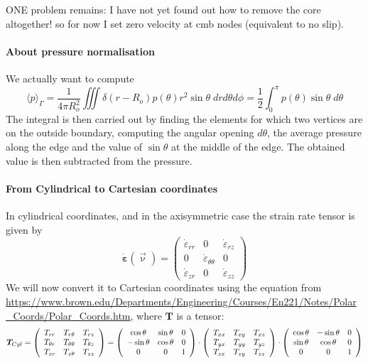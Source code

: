 ONE problem remains: I have not yet found out how to remove the core altogether!
so for now I set zero velocity at cmb nodes (equivalent to no slip).

\paragraph{About pressure normalisation}

We actually want to compute 
\[
\langle p \rangle _\Gamma = \frac{1}{4\pi R_o^2} \iiint \delta(r-R_o) p(\theta) r^2 \sin\theta \; dr d\theta d\phi 
= \frac{1}{2} \int_0^\pi p(\theta) \sin\theta \; d\theta
\]
The integral is then carried out by finding the elements for which two vertices are on the outside boundary, 
computing the angular opening $d\theta$, the average pressure along the edge and the value of $\sin\theta$ at the
middle of the edge. 
The obtained value is then subtracted from the pressure. 

\paragraph{From Cylindrical to Cartesian coordinates}

In cylindrical coordinates, and in the axisymmetric case
the strain rate tensor is given by
\[
\dot{\bm\varepsilon}(\vec\upnu)
=
\left(
\begin{array}{ccc}
\dot\varepsilon_{rr} & 0 & \dot{\varepsilon}_{rz} \\
0 & \dot{\varepsilon}_{\theta\theta}  & 0 \\
\dot{\varepsilon}_{zr} & 0 & \dot\varepsilon_{zz}
\end{array}
\right)
\]
We will now convert it to Cartesian coordinates using the equation from \url{https://www.brown.edu/Departments/Engineering/Courses/En221/Notes/Polar_Coords/Polar_Coords.htm}, where ${\bm T}$ is a tensor:
\[
{\bm T}_{\tiny Cyl}=
\left(
\begin{array}{ccc}
T_{rr}       & T_{r\theta}      & T_{rz} \\
T_{\theta r} & T_{\theta\theta} & T_{\theta z} \\
T_{z r}      & T_{z \theta}     & T_{zz}
\end{array}
\right)
=
\left(
\begin{array}{ccc}
 \cos \theta&\sin \theta&0 \\
-\sin \theta&\cos \theta&0 \\
0 & 0 & 1 
\end{array}
\right)
\cdot
\left(
\begin{array}{ccc}
T_{xx} & T_{xy} & T_{xz} \\
T_{yx} & T_{yy} & T_{yz} \\
T_{zx} & T_{zy} & T_{zz} 
\end{array}
\right)
\cdot
\left(
\begin{array}{ccc}
\cos \theta & -\sin \theta&0 \\
\sin \theta &  \cos \theta&0 \\
0 & 0 & 1 
\end{array}
\right)
\]

